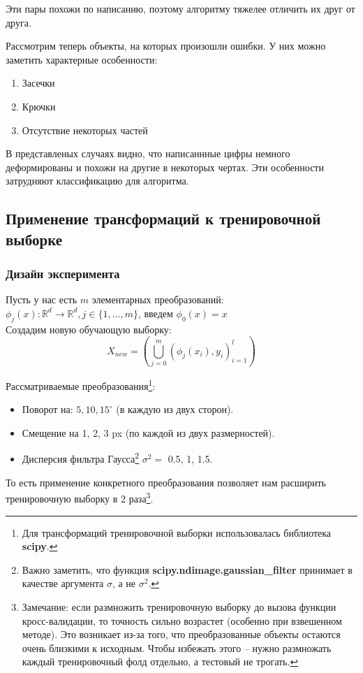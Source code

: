 \documentclass[a4paper, 11pt]{article}
\begin{document}
    Эти пары похожи по написанию, поэтому алгоритму тяжелее отличить их друг от друга. 
    
    Рассмотрим теперь объекты, на которых произошли ошибки. У них можно заметить характерные особенности:
    \begin{enumerate}
        \item Засечки
        \item Крючки
        \item Отсутствие некоторых частей
    \end{enumerate}
    
    В представленых случаях видно, что написаннные цифры немного деформированы и похожи на другие в некоторых чертах. Эти особенности затрудняют классификацию для алгоритма.
    \\
    \subsection{Применение трансформаций к тренировочной выборке} \label{exp5}
    \subsubsection{Дизайн эксперимента}
    Пусть у нас есть $m$ элементарных преобразований: $\phi_{j}(x): \mathbb{R}^d \rightarrow \mathbb{R}^d, j \in \{1, \dots, m\}$, введем $\phi_{0}(x) = x$
    \\ 
    Создадим новую обучающую выборку:
    \[X_{new} = \left(\bigcup_{j=0}^m (\phi_{j}(x_{i}), y_{i})_{i=1}^l \right)\]
    
    Рассматриваемые преобразования\footnote{Для трансформаций тренировочной выборки использовалась библиотека \textbf{scipy}.}:
    \begin{itemize}
        \item Поворот на: $5, 10, 15^{\circ}$ (в каждую из двух сторон).
        \item Смещение на 1, 2, 3 px (по каждой из двух размерностей).
        \item Дисперсия фильтра Гаусса\footnote{Важно заметить, что функция \textbf{scipy.ndimage.gaussian\_filter} принимает в качестве аргумента $\sigma$, а не $\sigma^2$.} $\sigma^2=$ 0.5, 1, 1.5.
    \end{itemize}

    То есть применение конкретного преобразования позволяет нам расширить тренировочную выборку в 2 раза\footnote{Замечание: если размножить тренировочную выборку до вызова функции кросс-валидации, то точность сильно возрастет (особенно при взвешенном методе). Это возникает из-за того, что преобразованные объекты остаются очень близкими к исходным. Чтобы избежать этого -- нужно размножать каждый тренировочный фолд отдельно, а тестовый не трогать.}.
\end{document}
